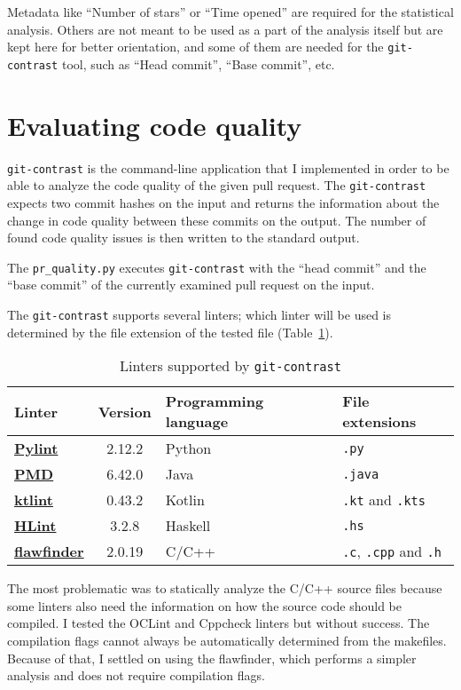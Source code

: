 \documentclass[digital,oneside,oldtable,nolof,nolot,nocover]{fithesis4}
\begin{document}
Metadata like ``Number of stars'' or ``Time opened'' are required for the
statistical analysis.  Others are not meant to be used as a part of the
analysis itself but are kept here for better orientation, and some of them
are needed for the \texttt{git-contrast} tool, such as ``Head commit'', ``Base commit'', etc.
\FloatBarrier
\section{Evaluating code quality}
\label{sec:org7dfd07d}
\texttt{git-contrast} is the command-line application that I implemented in order to
be able to analyze the code quality of the given pull request. The \texttt{git-contrast}
expects two commit hashes on the input and returns the information about the
change in code quality between these commits on the output.
The number of found code quality issues is
then written to the standard output.

The \texttt{pr\_quality.py} executes \texttt{git-contrast} with the ``head commit'' and the ``base commit'' of the
currently examined pull request on the input.

The \texttt{git-contrast} supports several linters; which linter will be
used is determined by the file extension of the tested file (Table~\ref{tab:org2a7afad}).
\begin{table}[htbp]
\caption{\label{tab:org2a7afad}Linters supported by \texttt{git-contrast}}
\centering
\scriptsize
\begin{tabular}{|lcll|}
\hline
Linter & Version & Programming language & File extensions\\
\hline
\hline
\href{https://pylint.pycqa.org/}{\textbf{Pylint}} & 2.12.2 & Python & \texttt{.py}\\
\href{https://pmd.github.io/}{\textbf{PMD}} & 6.42.0 & Java & \texttt{.java}\\
\href{https://ktlint.github.io/}{\textbf{ktlint}} & 0.43.2 & Kotlin & \texttt{.kt} and \texttt{.kts}\\
\href{https://github.com/ndmitchell/hlint}{\textbf{HLint}} & 3.2.8 & Haskell & \texttt{.hs}\\
\href{https://dwheeler.com/flawfinder/}{\textbf{flawfinder}} & 2.0.19 & C/C++ & \texttt{.c}, \texttt{.cpp} and \texttt{.h}\\
\hline
\end{tabular}
\end{table}

The most problematic was to statically analyze the C/C++ source files because
some linters also need the information on how the source code should be
compiled. I tested the OCLint and Cppcheck linters but without success.
The compilation flags cannot always be automatically determined from the makefiles.
Because of that, I settled on using the flawfinder, which performs a simpler analysis and
does not require compilation flags.
\end{document}
